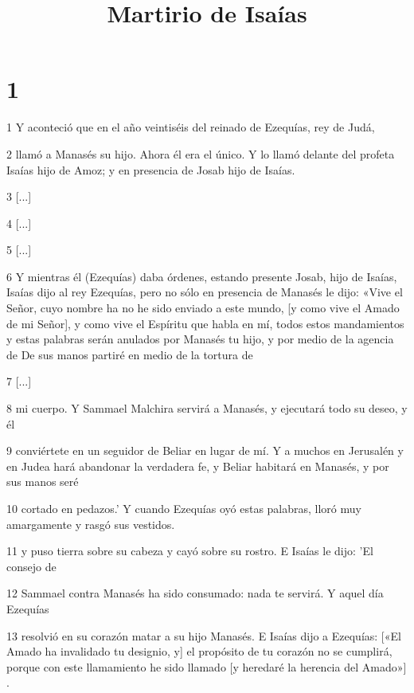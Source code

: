 

\title{Martirio de Isaías}

\chapter{1}

\par 1 Y aconteció que en el año veintiséis del reinado de Ezequías, rey de Judá,

\par 2 llamó a Manasés su hijo. Ahora él era el único. Y lo llamó delante del profeta Isaías hijo de Amoz; y en presencia de Josab hijo de Isaías.

\par 3 [...]

\par 4 [...]

\par 5 [...]

\par 6 Y mientras él (Ezequías) daba órdenes, estando presente Josab, hijo de Isaías, Isaías dijo al rey Ezequías, pero no sólo en presencia de Manasés le dijo: «Vive el Señor, cuyo nombre ha no he sido enviado a este mundo, [y como vive el Amado de mi Señor], y como vive el Espíritu que habla en mí, todos estos mandamientos y estas palabras serán anulados por Manasés tu hijo, y por medio de la agencia de De sus manos partiré en medio de la tortura de

\par 7 [...]

\par 8 mi cuerpo. Y Sammael Malchira servirá a Manasés, y ejecutará todo su deseo, y él

\par 9 conviértete en un seguidor de Beliar en lugar de mí. Y a muchos en Jerusalén y en Judea hará abandonar la verdadera fe, y Beliar habitará en Manasés, y por sus manos seré

\par 10 cortado en pedazos.' Y cuando Ezequías oyó estas palabras, lloró muy amargamente y rasgó sus vestidos.

\par 11 y puso tierra sobre su cabeza y cayó sobre su rostro. E Isaías le dijo: 'El consejo de

\par 12 Sammael contra Manasés ha sido consumado: nada te servirá. Y aquel día Ezequías

\par 13 resolvió en su corazón matar a su hijo Manasés. E Isaías dijo a Ezequías: [«El Amado ha invalidado tu designio, y] el propósito de tu corazón no se cumplirá, porque con este llamamiento he sido llamado [y heredaré la herencia del Amado»] .

